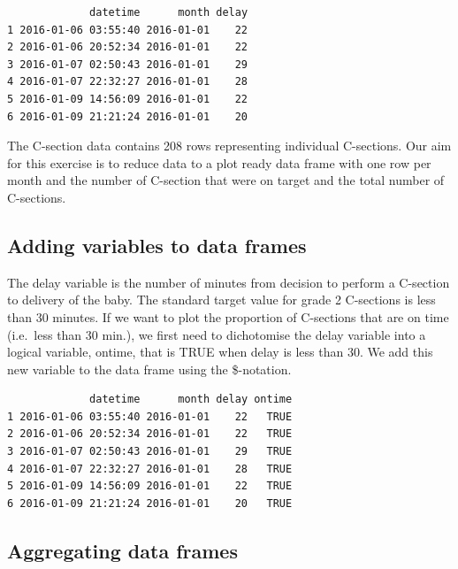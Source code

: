 \documentclass[
]{book}
\newenvironment{Shaded}{\begin{snugshade}}{\end{snugshade}}
\newcommand{\CommentTok}[1]{\textcolor[rgb]{0.56,0.35,0.01}{\textit{#1}}}
\newcommand{\DecValTok}[1]{\textcolor[rgb]{0.00,0.00,0.81}{#1}}
\newcommand{\FunctionTok}[1]{\textcolor[rgb]{0.13,0.29,0.53}{\textbf{#1}}}
\newcommand{\NormalTok}[1]{#1}
\newcommand{\OtherTok}[1]{\textcolor[rgb]{0.56,0.35,0.01}{#1}}
\newcommand{\SpecialCharTok}[1]{\textcolor[rgb]{0.81,0.36,0.00}{\textbf{#1}}}
\begin{document}
\begin{verbatim}
             datetime      month delay
1 2016-01-06 03:55:40 2016-01-01    22
2 2016-01-06 20:52:34 2016-01-01    22
3 2016-01-07 02:50:43 2016-01-01    29
4 2016-01-07 22:32:27 2016-01-01    28
5 2016-01-09 14:56:09 2016-01-01    22
6 2016-01-09 21:21:24 2016-01-01    20
\end{verbatim}

The C-section data contains 208 rows representing individual C-sections. Our aim for this exercise is to reduce data to a plot ready data frame with one row per month and the number of C-section that were on target and the total number of C-sections.

\subsection{Adding variables to data frames}\label{adding-variables-to-data-frames}

The delay variable is the number of minutes from decision to perform a C-section to delivery of the baby. The standard target value for grade 2 C-sections is less than 30 minutes. If we want to plot the proportion of C-sections that are on time (i.e.~less than 30 min.), we first need to dichotomise the delay variable into a logical variable, ontime, that is TRUE when delay is less than 30. We add this new variable to the data frame using the \$-notation.

\begin{Shaded}
\end{Shaded}

\begin{verbatim}
             datetime      month delay ontime
1 2016-01-06 03:55:40 2016-01-01    22   TRUE
2 2016-01-06 20:52:34 2016-01-01    22   TRUE
3 2016-01-07 02:50:43 2016-01-01    29   TRUE
4 2016-01-07 22:32:27 2016-01-01    28   TRUE
5 2016-01-09 14:56:09 2016-01-01    22   TRUE
6 2016-01-09 21:21:24 2016-01-01    20   TRUE
\end{verbatim}

\subsection{Aggregating data frames}\label{aggregating-data-frames}
\end{document}
